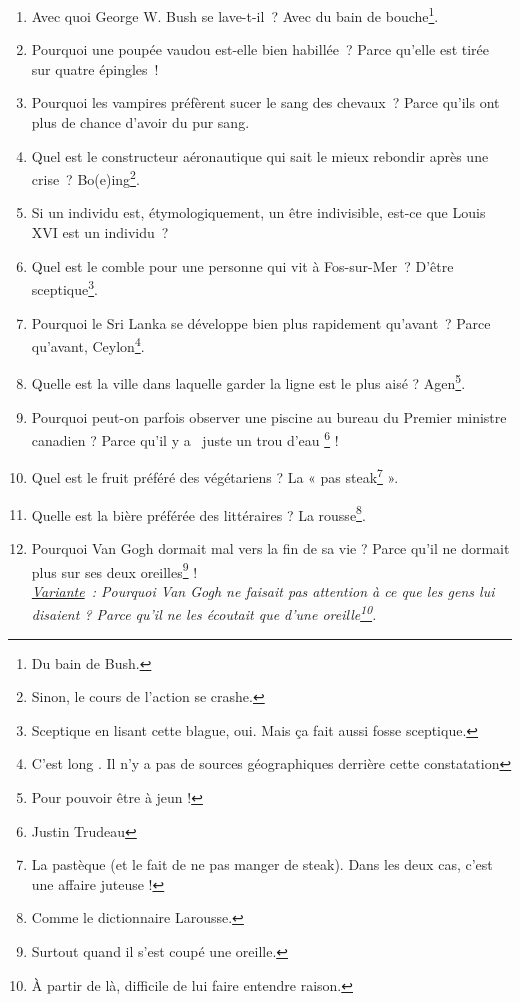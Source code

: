 \documentclass[10pt,a5paper,fullpage]{book}
\begin{document}
\begin{enumerate}
		\item Avec quoi George W. Bush se lave-t-il~? Avec du bain de bouche\footnote{Du bain de Bush.}.  
		\item Pourquoi une poupée vaudou est-elle bien habillée~? Parce qu’elle est tirée sur quatre épingles~!
		\item Pourquoi les vampires préfèrent sucer le sang des chevaux~? Parce qu’ils ont plus de chance d’avoir du pur sang. 
		\item Quel est le constructeur aéronautique qui sait le mieux rebondir après une crise~? Bo(e)ing\footnote{Sinon, le cours de l'action se crashe.}.
		\item Si un individu est, étymologiquement, un être indivisible, est-ce que Louis XVI est un individu~?
		\item Quel est le comble pour une personne qui vit à Fos-sur-Mer~? D'être sceptique\footnote{Sceptique en lisant cette blague, oui. Mais ça fait aussi fosse sceptique.}.
		\item Pourquoi le Sri Lanka se développe bien plus rapidement qu'avant~? Parce qu'avant, Ceylon\footnote{\guillemotleft C'est long \guillemotright. Il n'y a pas de sources géographiques derrière cette constatation}. 
		\item Quelle est la ville dans laquelle garder la ligne est le plus aisé ? Agen\footnote{Pour pouvoir être à jeun !}.
		\item Pourquoi peut-on parfois observer une piscine au bureau du Premier ministre canadien ? Parce qu'il y a \guillemotleft~juste un trou d'eau \guillemotright \footnote{Justin Trudeau} !
		\item Quel est le fruit préféré des végétariens ? La « pas steak\footnote{La pastèque (et le fait de ne pas manger de steak). Dans les deux cas, c'est une affaire juteuse !} ».
		\item Quelle est la bière préférée des littéraires ? La rousse\footnote{Comme le dictionnaire Larousse.}.
		\item Pourquoi Van Gogh dormait mal vers la fin de sa vie ? Parce qu'il ne dormait plus sur ses deux oreilles\footnote{Surtout quand il s'est coupé une oreille.} !
		\\\textit{\underline{Variante}~: Pourquoi Van Gogh ne faisait pas attention à ce que les gens lui disaient ? Parce qu'il ne les écoutait que d'une oreille\footnote{À partir de là, difficile de lui faire entendre raison.}.}
	\end{enumerate}
	
\end{document}
